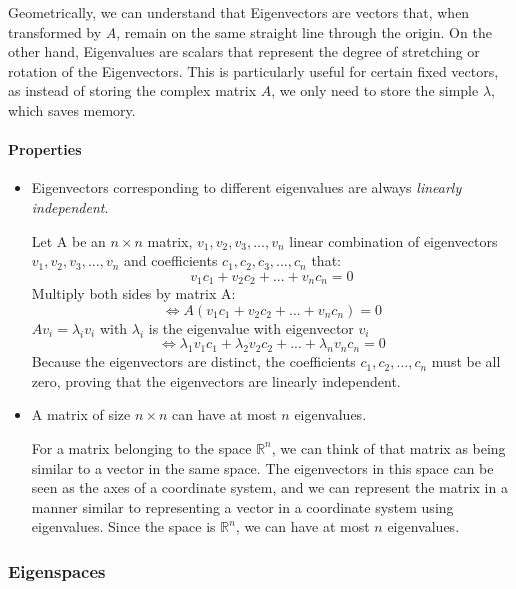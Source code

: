 \documentclass[a4paper,12pt]{article}
\begin{document}
\begin{frame}
Geometrically, we can understand that Eigenvectors are vectors that, when transformed by \( A \), remain on the same straight line through the origin. On the other hand, Eigenvalues are scalars that represent the degree of stretching or rotation of the Eigenvectors. This is particularly useful for certain fixed vectors, as instead of storing the complex matrix \( A \), we only need to store the simple \( \lambda \), which saves memory.
\paragraph{Properties}
\begin{itemize}
    \item Eigenvectors corresponding to different eigenvalues are always \textit{linearly independent}.
    
    Let A be an \(n \times n\) matrix, \(v_1, v_2, v_3,..., v_n\) linear combination of eigenvectors \(v_1, v_2, v_3,..., v_n\) and coefficients \(c_1, c_2, c_3,...,c_n\) that:
    \[v_1c_1 + v_2c_2+...+v_nc_n=0\]
    Multiply both sides by matrix A:
    \[\Longleftrightarrow A(v_1c_1 + v_2c_2+...+v_nc_n)=0\]
    \(Av_i = \lambda_iv_i\) with \(\lambda_i\) is the eigenvalue with eigenvector \(v_i\) 
    \[\Longleftrightarrow \lambda_1v_1c_1 + \lambda_2v_2c_2+...+\lambda_nv_nc_n=0\]
    Because the eigenvectors are distinct, the coefficients \(c_1, c_2, ..., c_n\) must be all zero, proving that the eigenvectors are linearly independent.  
    \item A matrix of size \(n \times n\) can have at most \(n\) eigenvalues.

    For a matrix belonging to the space \(\mathbb{R}^n\), we can think of that matrix as being similar to a vector in the same space. The eigenvectors in this space can be seen as the axes of a coordinate system, and we can represent the matrix in a manner similar to representing a vector in a coordinate system using eigenvalues. Since the space is \(\mathbb{R}^n\), we can have at most \(n\) eigenvalues.

\end{itemize}
\end{frame}
\small \subsubsection{Eigenspaces}
\end{document}
